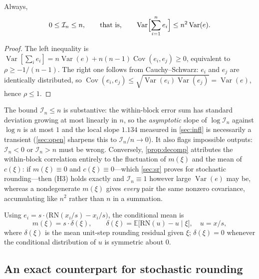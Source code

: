 \documentclass[twocolumn,review,hidelinks,oneeqnum,onetabnum,onefignum,onethmnum]{siamart251216}
\begin{document}
\begin{corollary}
\label{cor:bounds}
Always,
\begin{equation}
0\le \mathcal I_n\le n ,
\qquad\text{that is,}\qquad
\operatorname{Var}\Bigl[\sum_{i=1}^{n}e_i\Bigr]\le n^2\operatorname{Var}(e).
\label{eq:bounds}
\end{equation}
\end{corollary}

\begin{proof}
The left inequality is
$\operatorname{Var}[\sum_i e_i]=n\operatorname{Var}(e)+n(n-1)\operatorname{Cov}(e_i,e_j)\ge0$,
equivalent to $\rho\ge-1/(n-1)$. The right one follows from Cauchy--Schwarz:
$e_i$ and $e_j$ are identically distributed, so
$\operatorname{Cov}(e_i,e_j)\le\sqrt{\operatorname{Var}(e_i)\operatorname{Var}(e_j)}=\operatorname{Var}(e)$,
hence $\rho\le1$.
\end{proof}

\begin{remark}
The bound $\mathcal I_n\le n$ is substantive: the within-block error sum has
standard deviation growing at most linearly in $n$, so the \emph{asymptotic}
slope of $\log\mathcal I_n$ against $\log n$ is at most $1$ and the local slope
$1.134$ measured in \cref{sec:infl} is necessarily a transient
(\cref{sec:open} sharpens this to $\mathcal I_n/n\to0$). It also flags
impossible outputs: $\mathcal I_n<0$ or $\mathcal I_n>n$ must be wrong.
Conversely, \cref{prop:decomp} attributes the within-block correlation entirely
to the fluctuation of $m(\xi)$ and the mean of $c(\xi)$: if $m(\xi)\equiv0$ and
$c(\xi)\equiv0$---which \cref{sec:sr} proves for stochastic rounding---then (H3)
holds exactly and $\mathcal I_n\equiv1$ however large $\operatorname{Var}(e)$ may
be, whereas a nondegenerate $m(\xi)$ gives \emph{every} pair the same nonzero
covariance, accumulating like $n^2$ rather than $n$ in a summation.
\end{remark}

Using $e_i=s\cdot\bigl(\mathrm{RN}(x_i/s)-x_i/s\bigr)$, the conditional mean is
\begin{equation}
m(\xi)=s\cdot\delta(\xi),\qquad
\delta(\xi)=\mathbb{E}\bigl[\mathrm{RN}(u)-u \mid \xi\bigr],\quad u=x/s,
\label{eq:mxi}
\end{equation}
where $\delta(\xi)$ is the mean unit-step rounding residual given $\xi$;
$\delta(\xi)=0$ whenever the conditional distribution of $u$ is symmetric about
$0$.

\subsection{An exact counterpart for stochastic rounding}
\label{sec:srtheory}
\end{document}
